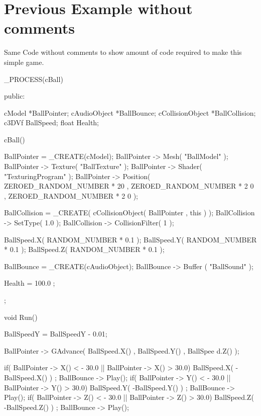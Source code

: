  \hypertarget{_code_program_examples_CompleteNoCommentsBouncingBallExample}{}\section{Previous Example without comments}\label{_code_program_examples_CompleteNoCommentsBouncingBallExample}
Same Code without comments to show amount of code required to make this simple game. 
\begin{DoxyCode}
 _PROCESS(cBall)
 {
 public:


 cModel *BallPointer;
 cAudioObject *BallBounce;
 cCollisionObject *BallCollision;
 c3DVf BallSpeed;
 float Health;

        cBall()
        {
        BallPointer =  _CREATE(cModel);
        BallPointer -> Mesh( "BallModel" );
        BallPointer -> Texture( "BallTexture" );
        BallPointer -> Shader( "TexturingProgram" );
        BallPointer -> Position( ZEROED_RANDOM_NUMBER * 20 ,
                                                         ZEROED_RANDOM_NUMBER * 2
      0 ,
                                                         ZEROED_RANDOM_NUMBER * 2
      0 );

        BallCollision = _CREATE( cCollisionObject( BallPointer , this ) );
        BallCollision -> SetType( 1.0 );
        BallCollision -> CollisionFilter( 1 );

        BallSpeed.X( RANDOM_NUMBER * 0.1 );
        BallSpeed.Y( RANDOM_NUMBER * 0.1 );
        BallSpeed.Z( RANDOM_NUMBER * 0.1 );

        BallBounce = _CREATE(cAudioObject);
        BallBounce -> Buffer ( "BallSound" );

        Health = 100.0 ;
        };

        void Run()
        {
                BallSpeedY = BallSpeedY - 0.01;

                BallPointer -> GAdvance( BallSpeed.X() , BallSpeed.Y() , BallSpee
      d.Z() );

                if( BallPointer -> X()  < - 30.0  || BallPointer -> X() > 30.0)
                {
                        BallSpeed.X( -BallSpeed.X() ) ;
                        BallBounce -> Play();
                }
                if( BallPointer -> Y()  < - 30.0  || BallPointer -> Y() > 30.0)
                {
                        BallSpeed.Y( -BallSpeed.Y() ) ;
                        BallBounce -> Play();
                }
                if( BallPointer -> Z()  < - 30.0  || BallPointer -> Z() > 30.0)
                {
                        BallSpeed.Z( -BallSpeed.Z() ) ;
                        BallBounce -> Play();
                }

}}
\end{DoxyCode}
